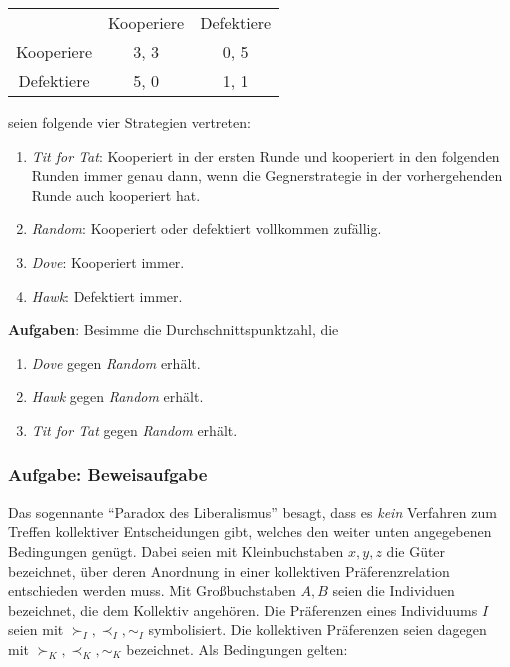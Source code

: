 \begin{center}
\begin{tabular}{c|c|c|}
\multicolumn{1}{c}{} & \multicolumn{1}{c}{Kooperiere} &
                               \multicolumn{1}{c}{Defektiere} \\ \cline{2-3} 
Kooperiere      & 3, 3           & 0, 5     
\\ \cline{2-3} 
Defektiere      & 5, 0           & 1, 1
\\ \cline{2-3}
\end{tabular}
\end{center}  

seien folgende vier Strategien vertreten:
\begin{enumerate}
  \item {\em Tit for Tat}: Kooperiert in der ersten Runde und kooperiert in den
  folgenden Runden immer genau dann, wenn die Gegnerstrategie in der vorhergehenden
  Runde auch kooperiert hat.
  \item {\em Random}: Kooperiert oder defektiert vollkommen zufällig.
  \item {\em Dove}: Kooperiert immer.
  \item {\em Hawk}: Defektiert immer.
\end{enumerate} 

\vspace{0.5cm}

{\bf Aufgaben}: Besimme die Durchschnittspunktzahl, die
\begin{enumerate}
  \item {\em Dove} gegen {\em Random} erhält.
  \item {\em Hawk} gegen {\em Random} erhält.
  \item {\em Tit for Tat} gegen {\em Random} erhält.
\end{enumerate}


\vspace{1cm}

\subsubsection{Aufgabe: Beweisaufgabe}

Das sogennante "`Paradox des Liberalismus"' besagt, dass es {\em kein}
Verfahren zum Treffen kollektiver Entscheidungen gibt, welches den weiter
unten angegebenen Bedingungen genügt. Dabei seien mit Kleinbuchstaben
$x,y,z$ die Güter bezeichnet, über deren Anordnung in einer
kollektiven Präferenzrelation entschieden werden muss. Mit
Großbuchstaben $A,B$ seien die Individuen bezeichnet, die dem
Kollektiv angehören. Die Präferenzen eines Individuums $I$ seien mit
$\succ_I, \prec_I, \sim_I $ symbolisiert. Die kollektiven
Präferenzen seien dagegen mit $\succ_K, \prec_K, \sim_K $
bezeichnet. Als Bedingungen gelten:

